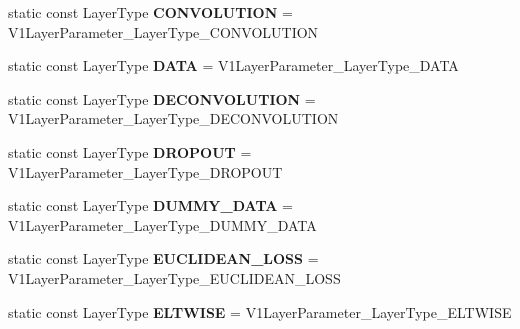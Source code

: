 \begin{DoxyCompactItemize}
\item 
\mbox{\label{classcaffe_1_1_v1_layer_parameter_a16f65b7195686528d2f8cbdc4b7455f8}} 
static const Layer\+Type {\bfseries C\+O\+N\+V\+O\+L\+U\+T\+I\+ON} = V1\+Layer\+Parameter\+\_\+\+Layer\+Type\+\_\+\+C\+O\+N\+V\+O\+L\+U\+T\+I\+ON
\item 
\mbox{\label{classcaffe_1_1_v1_layer_parameter_aa95d649c2f9f4ae46467fa1b3a6a9855}} 
static const Layer\+Type {\bfseries D\+A\+TA} = V1\+Layer\+Parameter\+\_\+\+Layer\+Type\+\_\+\+D\+A\+TA
\item 
\mbox{\label{classcaffe_1_1_v1_layer_parameter_ac1832bb809fef69c9f4554cc52128a3e}} 
static const Layer\+Type {\bfseries D\+E\+C\+O\+N\+V\+O\+L\+U\+T\+I\+ON} = V1\+Layer\+Parameter\+\_\+\+Layer\+Type\+\_\+\+D\+E\+C\+O\+N\+V\+O\+L\+U\+T\+I\+ON
\item 
\mbox{\label{classcaffe_1_1_v1_layer_parameter_a926fed70154bd7636548d1a11aa2336f}} 
static const Layer\+Type {\bfseries D\+R\+O\+P\+O\+UT} = V1\+Layer\+Parameter\+\_\+\+Layer\+Type\+\_\+\+D\+R\+O\+P\+O\+UT
\item 
\mbox{\label{classcaffe_1_1_v1_layer_parameter_a3d742f651b615ffc44d3478df861ce09}} 
static const Layer\+Type {\bfseries D\+U\+M\+M\+Y\+\_\+\+D\+A\+TA} = V1\+Layer\+Parameter\+\_\+\+Layer\+Type\+\_\+\+D\+U\+M\+M\+Y\+\_\+\+D\+A\+TA
\item 
\mbox{\label{classcaffe_1_1_v1_layer_parameter_a3b23fd7d274f19bc727f0185c66b396a}} 
static const Layer\+Type {\bfseries E\+U\+C\+L\+I\+D\+E\+A\+N\+\_\+\+L\+O\+SS} = V1\+Layer\+Parameter\+\_\+\+Layer\+Type\+\_\+\+E\+U\+C\+L\+I\+D\+E\+A\+N\+\_\+\+L\+O\+SS
\item 
\mbox{\label{classcaffe_1_1_v1_layer_parameter_a23df36fc68240938136ca83aa9304d4b}} 
static const Layer\+Type {\bfseries E\+L\+T\+W\+I\+SE} = V1\+Layer\+Parameter\+\_\+\+Layer\+Type\+\_\+\+E\+L\+T\+W\+I\+SE
\item 
\mbox{\label{classcaffe_1_1_v1_layer_parameter_acc43e7583e4552747e6ba57b9b874d9c}} 

\end{DoxyCompactItemize}
